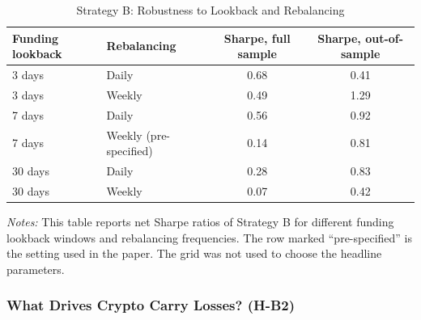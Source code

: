 \documentclass[11pt]{article}
\newcommand{\tabnote}[1]{\par\vspace{0.3em}\begin{minipage}{\linewidth}\footnotesize\setstretch{1.0}\textit{Notes:} #1\end{minipage}}
\begin{document}
\begin{table}[!htbp]
\centering
\caption{Strategy B: Robustness to Lookback and Rebalancing}\label{tab:Crob}
\small
\begin{tabular}{llcc}
\toprule
Funding lookback & Rebalancing & Sharpe, full sample & Sharpe, out-of-sample \\
\midrule
3 days & Daily & 0.68 & 0.41 \\
3 days & Weekly & 0.49 & 1.29 \\
7 days & Daily & 0.56 & 0.92 \\
7 days & Weekly (pre-specified) & 0.14 & 0.81 \\
30 days & Daily & 0.28 & 0.83 \\
30 days & Weekly & 0.07 & 0.42 \\
\bottomrule
\end{tabular}
\tabnote{This table reports net Sharpe ratios of Strategy B for different funding lookback windows and rebalancing frequencies. The row marked ``pre-specified'' is the setting used in the paper. The grid was not used to choose the headline parameters.}
\end{table}

\subsubsection{What Drives Crypto Carry Losses? (H-B2)}
\end{document}
